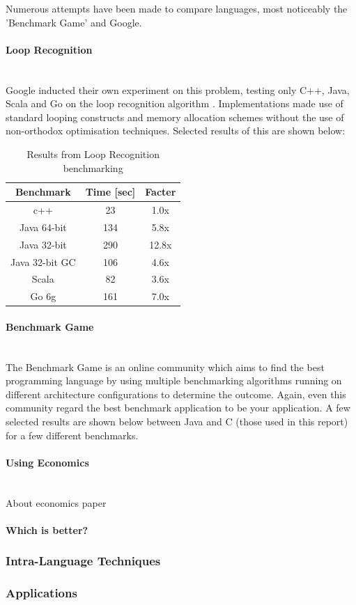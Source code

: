 \documentclass[final_report.tex]{subfiles}
\begin{document}
Numerous attempts have been made to compare languages, most noticeably the 'Benchmark Game' and Google. 
\paragraph{Loop Recognition}\mbox{}\\
Google inducted their own experiment on this problem, testing only C++, Java, Scala and Go on the loop recognition algorithm . Implementations made use of standard looping constructs and memory allocation schemes without the use of non-orthodox optimisation techniques. Selected results of this are shown below: 

\begin{table}[H]
	\centering
	\begin{tabular} { | c | c | c | }
		\hline
		\textbf{Benchmark} & \textbf{Time [sec]} & \textbf{Facter} \\
		\hline
		c++ & 23 & 1.0x \\
		\hline
		Java 64-bit & 134 & 5.8x \\
		\hline
		Java 32-bit & 290 & 12.8x \\
		\hline
		Java 32-bit GC & 106 & 4.6x \\ 
		\hline
		Scala & 82 & 3.6x \\ 
		\hline
		Go 6g & 161 & 7.0x \\
		\hline
	\end{tabular}
	\caption{Results from Loop Recognition benchmarking}
	\label{tab:loop_recog}
\end{table}

\paragraph{Benchmark Game}\mbox{}\\
The Benchmark Game is an online community which aims to find the best programming language by using multiple benchmarking algorithms running on different architecture configurations to determine the outcome. Again, even this community regard the best benchmark application to be your application. A few selected results are shown below between Java and C (those used in this report) for a few different benchmarks. 

\paragraph{Using Economics}\mbox{}\\
About economics paper

\paragraph{Which is better?}

\subsubsection{Intra-Language Techniques}
\subsubsection{Applications}
\end{document}
